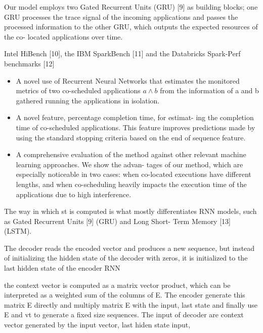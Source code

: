 \documentclass[8pt,UTF8]{article}
\begin{document}
                Our model employs two Gated Recurrent Units (GRU) [9] as building blocks; one GRU processes the trace signal of the incoming applications and passes the processed information to the other GRU, which outputs the expected resources of the co- located applications over time.
                
                Intel HiBench [10], the IBM SparkBench [11] and the Databricks Spark-Perf benchmarks [12]
                
                \begin{itemize}
                	\item  A novel use of Recurrent Neural Networks that estimates the monitored metrics of two co-scheduled applications $a \wedge b$ from the information of a and b gathered running the applications in isolation.
                	\item A novel feature, percentage completion time, for estimat- ing the completion time of co-scheduled applications. This feature improves predictions made by using the standard stopping criteria based on the end of sequence feature.
                	\item A comprehensive evaluation of the method against other relevant machine learning approaches. We show the advan- tages of our method, which are especially noticeable in two cases: when co-located executions have different lengths, and when co-scheduling heavily impacts the execution time of the applications due to high interference.
                \end{itemize}
                
                The way in which st is computed is what mostly differentiates RNN models, such as Gated Recurrent Units [9] (GRU) and Long Short- Term Memory [13] (LSTM).
                
                The decoder reads the encoded vector and produces a new sequence, but instead of initializing the hidden state of the decoder with zeros, it is initialized to the last hidden state of the encoder RNN
                
                the context vector is computed as a matrix vector product, which can be interpreted as a weighted sum of the columns of E. The encoder generate this matrix E directly and multiply matrix E with the input, last state and finally use E and vt to generate a fixed size sequences. The input of decoder are context vector generated by the input vector, last hiden state input, 
                
\end{document}

